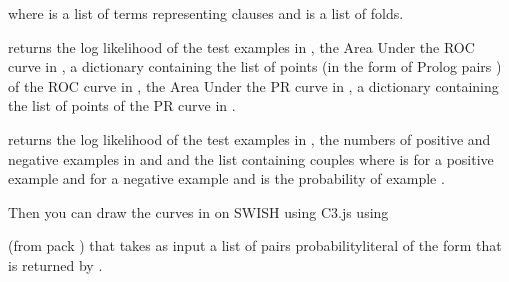 \documentclass[letterpaper,10pt,english]{sphinxmanual}
\begin{document}
\sphinxAtStartPar
where  is a list of terms representing clauses and  is a list of folds.

\sphinxAtStartPar
{} returns the log likelihood of the test examples in , the Area Under the ROC curve in , a dictionary containing the list of points (in the form of Prolog pairs ) of the ROC curve in , the Area Under the PR curve in , a dictionary containing the list of points of the PR curve in .

\sphinxAtStartPar
{} returns the log likelihood of the test examples in , the numbers of positive and negative examples in  and  and the list  containing couples  where  is  for  a positive example and  for  a negative example and  is the probability of example .

\sphinxAtStartPar
Then you can draw the curves in  on SWISH using C3.js using

\begin{sphinxVerbatim}[commandchars=\\\{\}]
  
\end{sphinxVerbatim}

\sphinxAtStartPar
(from pack ) that takes as input a list  of pairs probability\sphinxhyphen{}literal of the form that is returned by .
\end{document}
